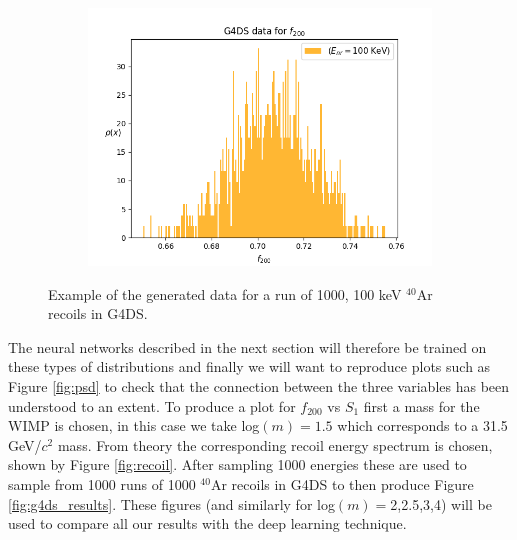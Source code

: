 \documentclass[11pt]{article} %
\begin{document}
\begin{figure}[H]\ContinuedFloat
\centering
\begin{minipage}{.5\textwidth}
  \centering
  \begin{subfigure}{.9\textwidth}
      \includegraphics[width=\textwidth]{./images/f200like_100.png}
  \end{subfigure}
\end{minipage}
\caption{Example of the generated data for a run of 1000, 100 keV $^{40}\mathrm{\text{Ar}}$ recoils in G4DS.}
\label{fig:example_vars}
\end{figure}
\par The neural networks described in the next section will therefore be trained on these types of distributions and finally we will want to reproduce
plots such as Figure \ref{fig:psd} to check that the connection between the three variables has been understood to an extent.
To produce a plot for $f_{200}$ vs $S_1$ first a mass for the WIMP is chosen, in this case we take log$(m)=1.5$ which corresponds to a 31.5 GeV/$c^2$ mass.
From theory the corresponding recoil energy spectrum is chosen, shown by Figure \ref{fig:recoil}.
After sampling 1000 energies these are used to sample from 1000 runs of 1000 $^{40}\mathrm{\text{Ar}}$ recoils in G4DS to then produce Figure \ref{fig:g4ds_results}.
These figures (and similarly for log$(m)=$2,2.5,3,4) will be used to compare all our results with the deep learning technique.
\end{document}
